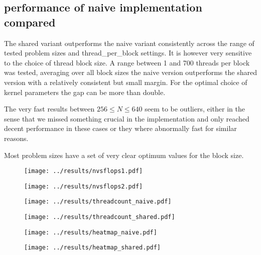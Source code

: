 \documentclass[11pt,twoside,a4paper]{scrartcl}
\begin{document}
\subsection{performance of naive implementation compared}

The shared variant outperforms the naive variant consistently across the range of tested problem sizes and thread\_per\_block settings. It is however very sensitive to the choice of thread block size. A range between 1 and 700 threads per block was tested, averaging over all block sizes the naive version outperforms the shared version with a relatively consistent but small margin. For the optimal choice of kernel parameters the gap can be more than double. 

The very fast results between $256 \le N \le 640$ seem to be outliers, either in the sense that we missed something crucial in the implementation and only reached decent performance in these cases or they where abnormally fast for similar reasons.

Most problem sizes have a set of very clear optimum values for the block size.

\begin{figure}
    \centering
    \texttt{[image: ../results/nvsflops1.pdf]}
\end{figure}
\begin{figure}
    \centering
    \texttt{[image: ../results/nvsflops2.pdf]}
\end{figure}
\begin{figure}
    \centering
    \texttt{[image: ../results/threadcount\_naive.pdf]}
\end{figure}
\begin{figure}
    \centering
    \texttt{[image: ../results/threadcount\_shared.pdf]}
\end{figure}

\begin{figure}
    \centering
    \texttt{[image: ../results/heatmap\_naive.pdf]}
\end{figure}
\begin{figure}
    \centering
    \texttt{[image: ../results/heatmap\_shared.pdf]}
\end{figure}
\end{document}

